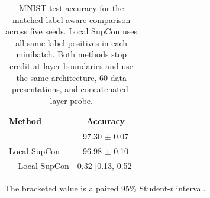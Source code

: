 \begin{table}[H]
\centering
\caption{MNIST test accuracy for the matched label-aware comparison across five seeds. Local SupCon uses all same-label positives in each minibatch. Both methods stop credit at layer boundaries and use the same architecture, 60 data presentations, and concatenated-layer probe.}
\label{tab:local-supcon-comparison}
\begin{tabular}{lc}
\toprule
Method & Accuracy \\
\midrule
\TeReLOffline{} & 97.30 $\pm$ 0.07 \\
Local SupCon & 96.98 $\pm$ 0.10 \\
\midrule
\TeReLOffline{} $-$ Local SupCon & 0.32 [0.13, 0.52] \\
\bottomrule
\end{tabular}
\par\smallskip\footnotesize The bracketed value is a paired 95\% Student-$t$ interval.
\end{table}
